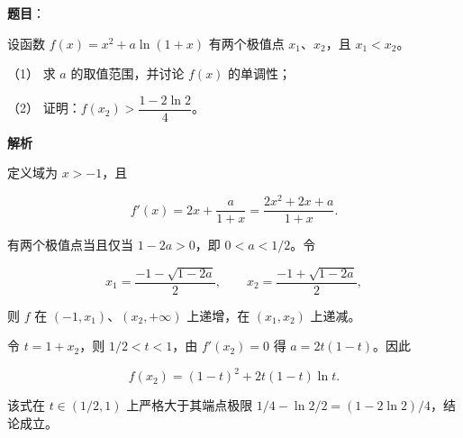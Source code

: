 \begin{answer}

\textbf{题目}：

设函数 $f(x)=x^2+a\ln(1+x)$ 有两个极值点 $x_1\text{、}x_2$，且 $x_1<x_2$。

（1） 求 $a$ 的取值范围，并讨论 $f(x)$ 的单调性；

（2） 证明：$f(x_2)>\dfrac{1-2\ln2}{4}$。

\textbf{解析}


定义域为 $x>-1$，且

\nopagebreak[4]
\[
f'(x)=2x+\frac a{1+x}
=\frac{2x^2+2x+a}{1+x}.
\]

有两个极值点当且仅当 $1-2a>0$，即
$0<a<1/2$。令

\nopagebreak[4]
\[
x_1=\frac{-1-\sqrt{1-2a}}2,\qquad
x_2=\frac{-1+\sqrt{1-2a}}2,
\]

则 $f$ 在 $(-1,x_1)$、$(x_2,+\infty)$ 上递增，在
$(x_1,x_2)$ 上递减。


令 $t=1+x_2$，则 $1/2<t<1$，由 $f'(x_2)=0$ 得
$a=2t(1-t)$。因此

\nopagebreak[4]
\[
f(x_2)=(1-t)^2+2t(1-t)\ln t.
\]

该式在 $t\in(1/2,1)$ 上严格大于其端点极限
$1/4-\ln2/2=(1-2\ln2)/4$，结论成立。



\end{answer}